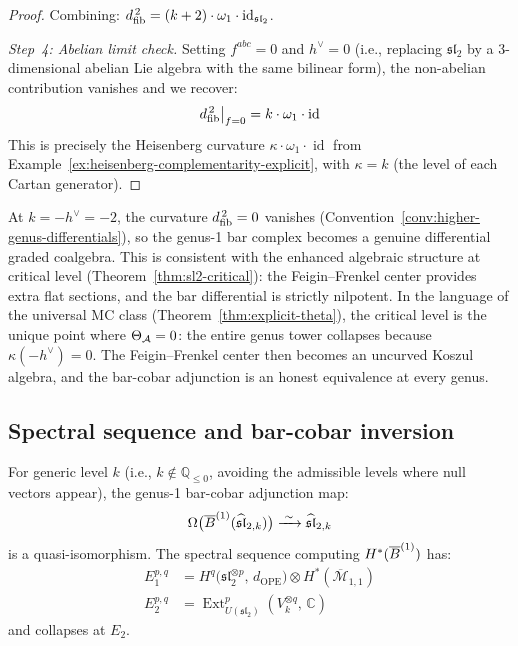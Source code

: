 \begin{proof}
Combining: $d_{\mathrm{fib}}^{\,2} = (k+2) \cdot \omega_1 \cdot \operatorname{id}_{\mathfrak{sl}_2}$.

\emph{Step~4: Abelian limit check.}
Setting $f^{abc} = 0$ and $h^\vee = 0$ (i.e., replacing $\mathfrak{sl}_2$ by a $3$-dimensional abelian Lie algebra with the same bilinear form), the non-abelian contribution vanishes and we recover:
\begin{equation}
d_{\mathrm{fib}}^{\,2}\big|_{f=0} = k \cdot \omega_1 \cdot \operatorname{id}
\end{equation}
This is precisely the Heisenberg curvature $\kappa \cdot \omega_1 \cdot \operatorname{id}$ from Example~\ref{ex:heisenberg-complementarity-explicit}, with $\kappa = k$ (the level of each Cartan generator).
\end{proof}

\begin{remark}
At $k = -h^\vee = -2$, the curvature $d_{\mathrm{fib}}^{\,2} = 0$ vanishes (Convention~\ref{conv:higher-genus-differentials}), so the genus-1 bar complex becomes a genuine differential graded coalgebra.  This is consistent with the enhanced algebraic structure at critical level (Theorem~\ref{thm:sl2-critical}): the Feigin--Frenkel center provides extra flat sections, and the bar differential is strictly nilpotent.
In the language of the universal MC class
(Theorem~\ref{thm:explicit-theta}), the critical level is
the unique point where $\Theta_{\mathcal{A}} = 0$: the entire genus
tower collapses because $\kappa(-h^\vee) = 0$.  The
Feigin--Frenkel center then becomes an uncurved Koszul algebra,
and the bar-cobar adjunction is an honest equivalence at
every genus.
\end{remark}

\subsection{Spectral sequence and bar-cobar inversion}

\begin{theorem}
\label{thm:sl2-genus1-inversion}
For generic level $k$ (i.e., $k \notin \mathbb{Q}_{\leq 0}$, avoiding the admissible levels where null vectors appear), the genus-1 bar-cobar adjunction map:
\begin{equation}
\Omega\bigl(\overline{B}^{(1)}(\widehat{\mathfrak{sl}}_{2,k})\bigr) \xrightarrow{\;\sim\;} \widehat{\mathfrak{sl}}_{2,k}
\end{equation}
is a quasi-isomorphism.  The spectral sequence computing $H^*(\overline{B}^{(1)})$ has:
\begin{align}
E_1^{p,q} &= H^q\bigl(\mathfrak{sl}_2^{\otimes p},\, d_{\mathrm{OPE}}\bigr) \otimes H^*(\overline{\mathcal{M}}_{1,1}) \\
E_2^{p,q} &= \operatorname{Ext}^p_{U(\mathfrak{sl}_2)}(V_k^{\otimes q},\, \mathbb{C})
\end{align}
and collapses at $E_2$.
\end{theorem}

